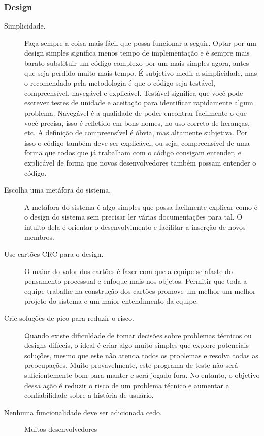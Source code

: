\subsubsection{Design}
\begin{description}
    \item[Simplicidade.] Faça sempre a coisa mais fácil que possa funcionar a seguir.
    Optar por um design simples significa menos tempo de implementação e é sempre mais
    barato substituir um código complexo por um mais simples agora, antes que seja
    perdido muito mais tempo. É subjetivo medir a simplicidade, mas o recomendado pela
    metodologia é que o código seja testável, compreensível, navegável e explicável.
    Testável significa que você pode escrever testes de unidade e aceitação para
    identificar rapidamente algum problema. Navegável é a qualidade de poder encontrar
    facilmente o que você precisa, isso é refletido em bons nomes, no uso correto de
    heranças, etc. A definição de compreensível é óbvia, mas altamente subjetiva. Por
    isso o código também deve ser explicável, ou seja, compreensível de uma forma que
    todos que já trabalham com o código consigam entender, e explicável de forma que
    novos desenvolvedores também possam entender o código.
    \item[Escolha uma metáfora do sistema.] A metáfora do sistema é algo simples que
    possa facilmente explicar como é o design do sistema sem precisar ler várias
    documentações para tal. O intuito dela é orientar o desenvolvimento e facilitar
    a inserção de novos membros.
    \item[Use cartões \gls{CRC} para o design.] O maior do valor dos cartões é fazer
    com que a equipe se afaste do pensamento processual e enfoque mais nos objetos.
    Permitir que toda a equipe trabalhe na construção dos cartões promove um melhor
    um melhor projeto do sistema e um maior entendimento da equipe.
    \item[Crie soluções de pico para reduzir o risco.] Quando existe dificuldade
    de tomar decisões sobre problemas técnicos ou designs difíceis, o ideal é criar
    algo muito simples que explore potenciais soluções, mesmo que este não atenda
    todos os problemas e resolva todas as preocupações. Muito provavelmente, este
    programa de teste não será suficientemente bom para manter e será jogado fora.
    No entanto, o objetivo dessa ação é reduzir o risco de um problema técnico e
        aumentar a confiabilidade sobre a história de usuário.
    \item[Nenhuma funcionalidade deve ser adicionada cedo.] Muitos desenvolvedores

\end{description}
